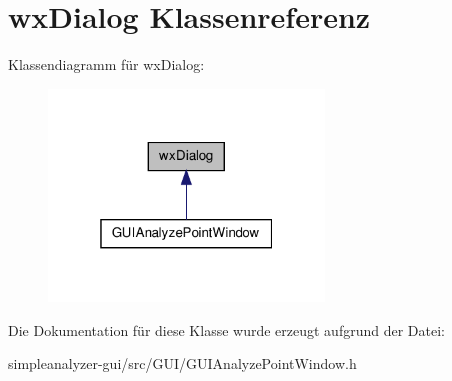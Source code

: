 \hypertarget{classwxDialog}{\section{wx\-Dialog Klassenreferenz}
\label{classwxDialog}
}


Klassendiagramm für wx\-Dialog\-:
\nopagebreak
\begin{figure}[H]
\begin{center}
\leavevmode
\includegraphics[width=208pt]{classwxDialog__inherit__graph}
\end{center}
\end{figure}


Die Dokumentation für diese Klasse wurde erzeugt aufgrund der Datei\-:\begin{DoxyCompactItemize}
\item 
simpleanalyzer-\/gui/src/\-G\-U\-I/G\-U\-I\-Analyze\-Point\-Window.\-h\end{DoxyCompactItemize}

